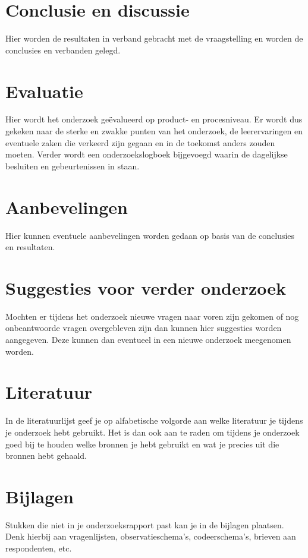 \documentclass{article}
\begin{document}
\section{Conclusie en discussie}
Hier worden de resultaten in verband gebracht met de vraagstelling en worden de conclusies en verbanden gelegd.

\section{Evaluatie}
Hier wordt het onderzoek geëvalueerd op product- en procesniveau. Er wordt dus gekeken naar de sterke en zwakke punten van het onderzoek, de leerervaringen en eventuele zaken die verkeerd zijn gegaan en in de toekomst anders zouden moeten. Verder wordt een onderzoekslogboek bijgevoegd waarin de dagelijkse besluiten en gebeurtenissen in staan.

\section{Aanbevelingen}
Hier kunnen eventuele aanbevelingen worden gedaan op basis van de conclusies en resultaten.

\section{Suggesties voor verder onderzoek}
Mochten er tijdens het onderzoek nieuwe vragen naar voren zijn gekomen of nog onbeantwoorde vragen overgebleven zijn dan kunnen hier suggesties worden aangegeven. Deze kunnen dan eventueel in een nieuwe onderzoek meegenomen worden.

\section{Literatuur}
In de literatuurlijst geef je op alfabetische volgorde aan welke literatuur je tijdens je onderzoek hebt gebruikt. Het is dan ook aan te raden om tijdens je onderzoek goed bij te houden welke bronnen je hebt gebruikt en wat je precies uit die bronnen hebt gehaald.

\section{Bijlagen}
Stukken die niet in je onderzoeksrapport past kan je in de bijlagen plaatsen. Denk hierbij aan vragenlijsten, observatieschema’s, codeerschema’s, brieven aan respondenten, etc.
\end{document}
